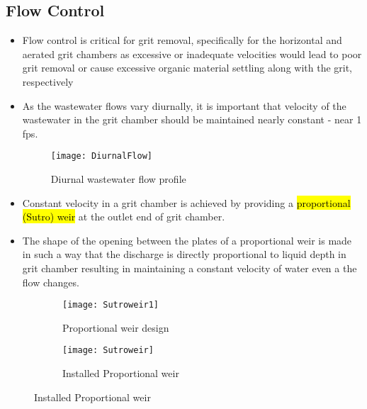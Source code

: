 \subsection{Flow Control}	
	\begin{itemize} 
		\item Flow control is critical for grit removal, specifically for the horizontal and aerated grit chambers as excessive or inadequate velocities would lead to poor grit removal or cause excessive organic material settling along with the grit, respectively
		\item As the wastewater flows vary diurnally, it is important that velocity of the wastewater in the grit chamber should be maintained nearly constant - near 1 fps.
		
\begin{figure}[h]
    \texttt{[image: DiurnalFlow]}\\
\begin{center}
Diurnal wastewater flow profile \\
\end{center}
  \end{figure}		

		\item Constant velocity in a grit chamber is achieved by providing a \hl{proportional (Sutro) weir} at the outlet end of grit chamber.
		\item The shape of the opening between the plates of a proportional weir is made in such a way that the discharge is directly proportional to liquid depth in grit chamber resulting in maintaining a constant velocity of water even a the flow changes.
	\end{itemize}
\begin{figure}[h!]
  \centering
  \begin{subfigure}[b]{0.5\linewidth}
    \texttt{[image: Sutroweir1]}
    \caption{Proportional weir design}
  \end{subfigure}
  \hspace{1cm}
  \begin{subfigure}[b]{0.35\linewidth}
    \texttt{[image: Sutroweir]}
    \caption{Installed Proportional weir}
  \end{subfigure}
\end{figure} 

